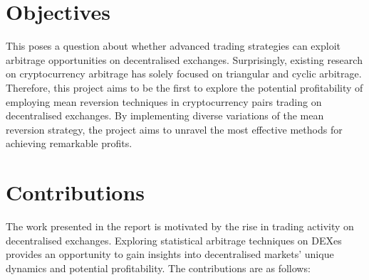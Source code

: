 \section{Objectives}
This poses a question about whether advanced trading strategies can exploit arbitrage opportunities on decentralised exchanges. Surprisingly, existing research on cryptocurrency arbitrage has solely focused on triangular and cyclic arbitrage. Therefore, this project aims to be the first to explore the potential profitability of employing mean reversion techniques in cryptocurrency pairs trading on decentralised exchanges. By implementing diverse variations of the mean reversion strategy, the project aims to unravel the most effective methods for achieving remarkable profits.

\section{Contributions}
The work presented in the report is motivated by the rise in trading activity on decentralised exchanges. Exploring statistical arbitrage techniques on DEXes provides an opportunity to gain insights into decentralised markets' unique dynamics and potential profitability. The contributions are as follows:
